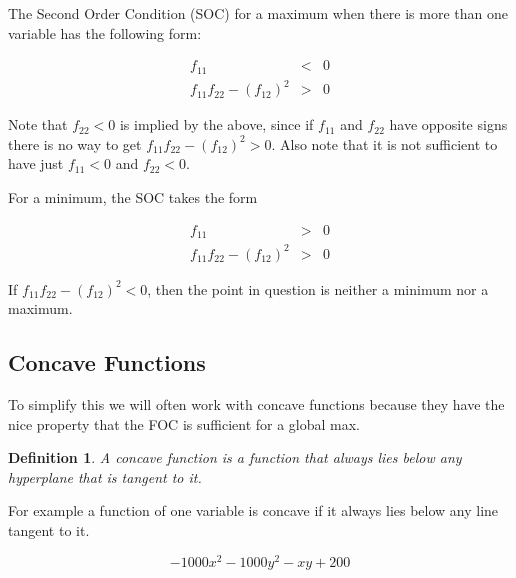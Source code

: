 \documentclass[11pt,english]{article}
\newtheorem{definition}[theorem]{Definition}
\begin{document}
The Second Order Condition (SOC) for a maximum when there is more than one
variable has the following form:

\begin{eqnarray*}
f_{11} &<&0 \\
f_{11}f_{22}-(f_{12})^{2} &>&0
\end{eqnarray*}

Note that $f_{22}<0$ is implied by the above, since if $f_{11}$ and $f_{22}$
have opposite signs there is no way to get $f_{11}f_{22}-(f_{12})^{2}>0$.
Also note that it is not sufficient to have just  $f_{11}<0$ and $f_{22}<0$.

\bigskip 

For a minimum, the SOC takes the form

\begin{eqnarray*}
f_{11} &>&0 \\
f_{11}f_{22}-(f_{12})^{2} &>&0
\end{eqnarray*}

\bigskip If $f_{11}f_{22}-(f_{12})^{2}<0$, then the point in question is
neither a minimum nor a maximum.



\subsection{Concave Functions}

To simplify this we will often work with concave functions because they have the nice property that the FOC is sufficient for a global max.

\begin{definition}
A concave function is a function that always lies below any hyperplane that
is tangent to it.
\end{definition}

For example a function of one variable is concave if it always lies below
any line tangent to it.

\begin{equation*}
-1000x^2-1000y^2-xy+200
\end{equation*}
\end{document}
